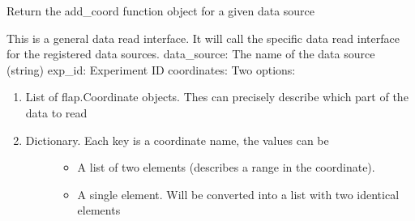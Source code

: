 \documentclass[letterpaper,10pt,english]{sphinxmanual}
\begin{document}

\begin{fulllineitems}
\label{\detokenize{data_object:flap.data_object.get_addcoord_function}}
Return the add\_coord function object for a given data source

\end{fulllineitems}


\begin{fulllineitems}
\label{\detokenize{data_object:flap.data_object.get_data}}
This is a general data read interface. It will call the specific data read interface
for the registered data sources.
data\_source: The name of the data source (string)
exp\_id: Experiment ID
coordinates: Two options:
\begin{enumerate}
%
\item {} 
List of flap.Coordinate objects. Thes can precisely describe which part of the data to read

\item {} \begin{description}
\item[{Dictionary. Each key is a coordinate name, the values can be}] \leavevmode\begin{itemize}
\item {} 
A list of two elements (describes a range in the coordinate).

\item {} 
A single element. Will be converted into a list with two identical elements


\end{itemize}
\end{description}
\end{enumerate}
\end{fulllineitems}
\end{document}
